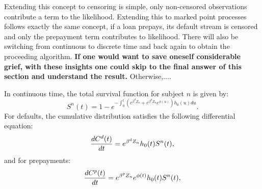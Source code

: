 \documentclass[10pt]{article}
\begin{document}
Extending this concept to censoring is simple, only non-censored observations contribute a term to the likelihood.  Extending this to marked point
processes follows exactly the same concept, if a loan prepays, its default stream is censored and only the prepayment term contributes to likelihood.
There will also be switching from continuous to discrete time and back again to obtain the proceeding algorithm.  {\bf If one would want to save 
oneself considerable grief, with these insights one could skip to the final answer of this section and understand the result.}  Otherwise,....

In continuous time, the total survival function for subject $n$ is given by:
$$S^n(t)=1-e^{-\int_0^t \left({e^{\beta^dZ_n}+e^{\beta^pZ_n}e^{\phi(u)}}\right)h_0(u)du}.$$
For defaults, the cumulative distribution satisfies the following differential equation:
$${dC^d(t)\over dt}=e^{\beta^dZ_n}h_0(t)S^n(t),$$
and for prepayments:
$${dC^p(t)\over dt}=e^{\beta^pZ_n}e^{\phi(t)}h_0(t)S^n(t),$$
\end{document}

